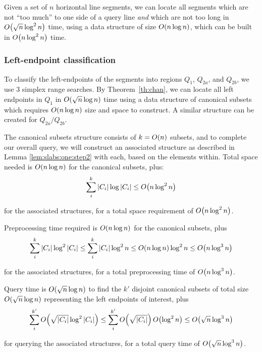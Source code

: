 \begin{lemma}
\label{lem:slabs:one:step2}
Given a set of $n$ horizontal line segments, we can locate all segments which are not ``too much'' to one side of a query line \emph{and} which are not too long in $O\!\left(\sqrt{n}\log^2{n}\right)$ time, using a data structure of size $O\!\left(n\log{n}\right)$, which can be built in $O\!\left(n\log^2{n}\right)$ time.
\end{lemma}


\subsubsection{Left-endpoint classification}

To classify the left-endpoints of the segments into regions $Q_1$, $Q_{2a}$, and $Q_{2b}$, we use 3 simplex range searches. By Theorem~\ref{th:chan}, we can locate all left endpoints in $Q_1$ in $O\!\left(\sqrt{n}\log{n}\right)$ time using a data structure of canonical subsets which requires $O\!\left(n \log{n}\right)$ size and space to construct. A similar structure can be created for $Q_{2a}/Q_{2b}$.

The canonical subsets structure consists of $k = O\!\left(n\right)$ subsets, and to complete our overall query, we will construct an associated structure as described in Lemma \ref{lem:slabs:one:step2} with each, based on the elements within. Total space needed is $O\!\left(n \log{n}\right)$ for the canonical subsets, plus:
\[
\sum_{i}^{k}{|C_i| \log{|C_i|}} \leq O\!\left(n\log^2{n}\right)
\]

\noindent for the associated structures, for a total space requirement of $O\!\left(n\log^2{n}\right)$.

Preprocessing time required is $O\!\left(n \log{n}\right)$ for the canonical subsets, plus
\[
\sum_{i}^{k}{|C_i| \log^2{|C_i|}} 
\leq \sum_{i}^{k}{|C_i| \log^2{n}} 
\leq O\!\left(n\log{n}\right) \log^2{n}
\leq O\!\left(n \log^3{n}\right)
\]

\noindent
for the associated structures, for a total preprocessing time of $O\!\left(n \log^3{n}\right)$.

Query time is $O\!\left(\sqrt{n}\log{n}\right)$ to find the $k'$ disjoint canonical subsets of total size $O\!\left(\sqrt{n}\log{n}\right)$ representing the left endpoints of interest, plus
\[
\sum_{i}^{k'}{O\!\left(\sqrt{|C_i|}\log^2{|C_i|}\right)} 
\leq \sum_{i}^{k'}{O\!\left(\sqrt{|C_i|}\right)O\!\left(\log^2{n}\right)} 
\leq O\!\left(\sqrt{n}\log^3{n}\right)
\]

\noindent
for querying the associated structures, for a total query time of $O\!\left(\sqrt{n} \log^3{n}\right)$. 

